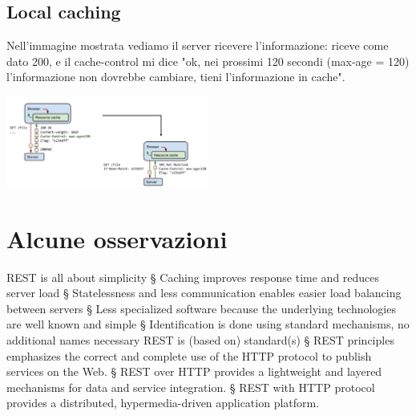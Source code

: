 \subsection{Local caching}
Nell'immagine mostrata vediamo il server ricevere l'informazione: riceve come dato 200, e il cache-control mi dice "ok, nei prossimi 120 secondi (max-age = 120) l'informazione non dovrebbe cambiare, tieni l'informazione in cache".
\begin{center}
    \includegraphics[width=0.5\textwidth]{img/REST2.jpg}
\end{center}

\section{Alcune osservazioni}
REST is all about simplicity
§ Caching improves response time and reduces server load
§ Statelessness and less communication enables easier load balancing between servers
§ Less specialized software because the underlying technologies are well known and simple
§ Identification is done using standard mechanisms, no additional names necessary
REST is (based on) standard(s)
§ REST principles emphasizes the correct and complete use of the HTTP protocol to publish services on the Web.
§ REST over HTTP provides a lightweight and layered mechanisms for data and service integration.
§ REST with HTTP protocol provides a distributed, hypermedia-driven application platform.

